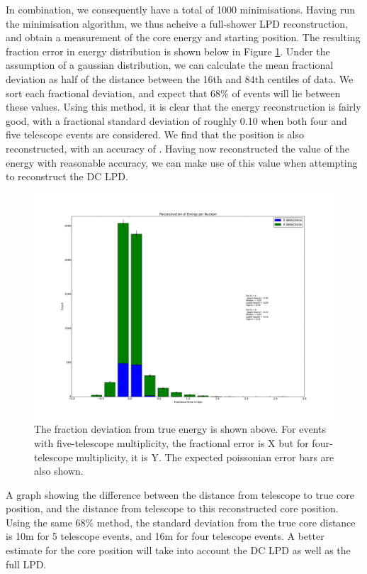 \documentclass[11pt]{article}
\begin{document}
In combination, we consequently have a total of 1000 minimisations. Having run the minimisation algorithm, we thus acheive a full-shower LPD reconstruction, and obtain a measurement of the core energy and starting position. The resulting fraction error in energy distribution is shown below in Figure \ref{fig:rawepn}. Under the assumption of a gaussian distribution, we can calculate the mean fractional deviation as half of the distance between the 16th and 84th centiles of data. We sort each fractional deviation, and expect that 68\% of events will lie between these values. Using this method, it is clear that the energy reconstruction is fairly good, with a fractional standard deviation of roughly 0.10 when both four and five telescope events are considered. We find that the position is also reconstructed, with an accuracy of . Having now reconstructed the value of the energy with reasonable accuracy, we can make use of this value when attempting to reconstruct the DC LPD. 

\begin{figure}
\begin{center}
\includegraphics[width=\textwidth]{rawepn}
\caption{The fraction deviation from true energy is shown above. For events with five-telescope multiplicity, the fractional error is X but for four-telescope multiplicity, it is Y. The expected poissonian error bars are also shown.}
\label{fig:rawepn}
\end{center}
\end{figure}  
A graph showing the difference between the distance from telescope to true core position, and the distance from telescope to this reconstructed core position. Using the same 68\% method, the standard deviation from the true core distance  is 10m for 5 telescope events, and 16m for four telescope events. A better estimate for the core position will take into account the DC LPD as well as the full LPD.
\end{document}

